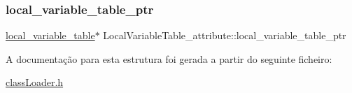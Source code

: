 \subsubsection{\texorpdfstring{local\+\_\+variable\+\_\+table\+\_\+ptr}{local\_variable\_table\_ptr}}
{\footnotesize\ttfamily \hyperlink{structlocal__variable__table}{local\+\_\+variable\+\_\+table}$\ast$ Local\+Variable\+Table\+\_\+attribute\+::local\+\_\+variable\+\_\+table\+\_\+ptr}



A documentação para esta estrutura foi gerada a partir do seguinte ficheiro\+:\begin{DoxyCompactItemize}
\item 
\hyperlink{class_loader_8h}{class\+Loader.\+h}\end{DoxyCompactItemize}
